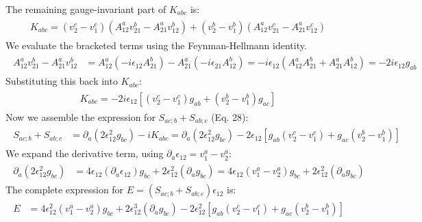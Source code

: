 \documentclass[twocolumn, prx, reprint, amsfonts, amsmath, amssymb, longbibliography, floatfix, aps]{revtex4-2}
\begin{document}
The remaining gauge-invariant part of $K_{abc}$ is:
\begin{align}
\begin{aligned}
K_{abc} = (v_2^c - v_1^c) (A_{12}^a v_{21}^b - A_{21}^a v_{12}^b) + (v_2^b - v_1^b) (A_{12}^a v_{21}^c - A_{21}^a v_{12}^c)
\end{aligned}
\end{align}
We evaluate the bracketed terms using the Feynman-Hellmann identity.
\begin{align}
\begin{aligned}
A_{12}^a v_{21}^b - A_{21}^a v_{12}^b &= A_{12}^a (-i\epsilon_{12} A_{21}^b) - A_{21}^a (-i\epsilon_{21} A_{12}^b) = -i\epsilon_{12} (A_{12}^a A_{21}^b + A_{21}^a A_{12}^b) = -2i\epsilon_{12} g_{ab}
\end{aligned}
\end{align}
Substituting this back into $K_{abc}$:
\begin{align}
\begin{aligned}
K_{abc} = -2i \epsilon_{12} \left[ (v_2^c - v_1^c) g_{ab} + (v_2^b - v_1^b) g_{ac} \right]
\end{aligned}
\end{align}
Now we assemble the expression for $S_{ac;b} + S_{ab;c}$ (Eq. 28):
\begin{align}
\begin{aligned}
S_{ac;b} + S_{ab;c} &= \partial_a (2 \epsilon_{12}^2 g_{bc}) - i K_{abc} = \partial_a (2 \epsilon_{12}^2 g_{bc}) - 2 \epsilon_{12} \left[ g_{ab} (v_2^c - v_1^c) + g_{ac} (v_2^b - v_1^b) \right]
\end{aligned}
\end{align}
We expand the derivative term, using $\partial_a \epsilon_{12} = v_1^a - v_2^a$:
\begin{align}
\begin{aligned}
\partial_a (2 \epsilon_{12}^2 g_{bc}) &= 4 \epsilon_{12} (\partial_a \epsilon_{12}) g_{bc} + 2 \epsilon_{12}^2 (\partial_a g_{bc}) = 4 \epsilon_{12} (v_1^a - v_2^a) g_{bc} + 2 \epsilon_{12}^2 (\partial_a g_{bc})
\end{aligned}
\end{align}
The complete expression for $E = (S_{ac;b} + S_{ab;c}) \epsilon_{12}$ is:
\begin{align}
\begin{aligned}
E &= 4 \epsilon_{12}^2 (v_1^a - v_2^a) g_{bc} + 2 \epsilon_{12}^3 (\partial_a g_{bc}) - 2 \epsilon_{12}^2 \left[ g_{ab} (v_2^c - v_1^c) + g_{ac} (v_2^b - v_1^b) \right]
\label{E_Term0}
\end{aligned}
\end{align}
\end{document}
